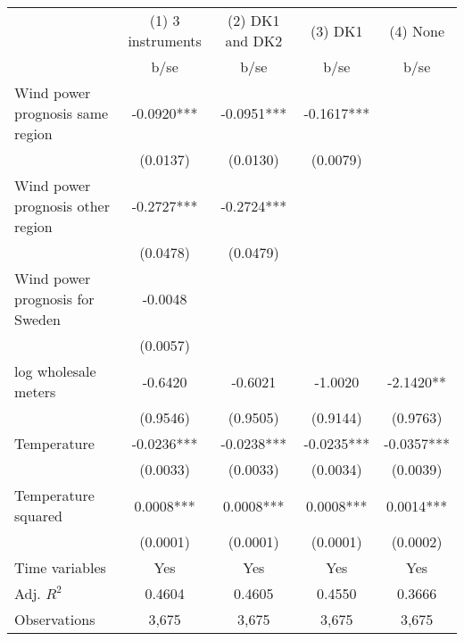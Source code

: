\begin{tabular}{lcccc}\toprule
                    &(1) 3 instruments   &(2) DK1 and DK2   &     (3) DK1   &    (4) None   \\
                    &        b/se   &        b/se   &        b/se   &        b/se   \\
\midrule
Wind power prognosis same region&     -0.0920***&     -0.0951***&     -0.1617***&               \\
                    &    (0.0137)   &    (0.0130)   &    (0.0079)   &               \\
Wind power prognosis other region&     -0.2727***&     -0.2724***&               &               \\
                    &    (0.0478)   &    (0.0479)   &               &               \\
Wind power prognosis for Sweden&     -0.0048   &               &               &               \\
                    &    (0.0057)   &               &               &               \\
log wholesale meters&     -0.6420   &     -0.6021   &     -1.0020   &     -2.1420** \\
                    &    (0.9546)   &    (0.9505)   &    (0.9144)   &    (0.9763)   \\
Temperature         &     -0.0236***&     -0.0238***&     -0.0235***&     -0.0357***\\
                    &    (0.0033)   &    (0.0033)   &    (0.0034)   &    (0.0039)   \\
Temperature squared &      0.0008***&      0.0008***&      0.0008***&      0.0014***\\
                    &    (0.0001)   &    (0.0001)   &    (0.0001)   &    (0.0002)   \\
Time variables      &         Yes   &         Yes   &         Yes   &         Yes   \\
\midrule
Adj. \(R^2\)        &      0.4604   &      0.4605   &      0.4550   &      0.3666   \\
Observations        &       3,675   &       3,675   &       3,675   &       3,675   \\
\bottomrule\end{tabular}
